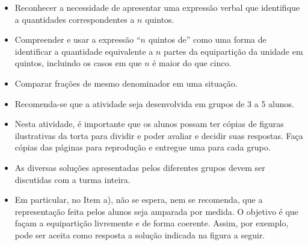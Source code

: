 \begin{multicols}{2}
\begin{objetivos}[label=chap2-ativ3]{}{}
  \begin{itemize} %
\item Reconhecer a necessidade de apresentar uma expressão verbal que identifique a quantidades correspondentes a $n$ quintos.
\item Compreender e usar a expressão ``$n$ quintos de'' como uma forma de identificar a quantidade equivalente a $n$ partes da equipartição da unidade em quintos, incluindo os casos em que $n$ é maior do que cinco.
\item Comparar frações de mesmo denominador em uma situação.
\end{itemize} %
\end{objetivos}

\begin{orientacoes}{}{}
  \begin{itemize} %
  \item Recomenda-se que a atividade seja desenvolvida em grupos de 3 a 5 alunos.
  \item Nesta atividade, é importante que os alunos possam ter cópias de figuras ilustrativas da torta para dividir e poder avaliar e decidir suas respostas. Faça cópias das páginas para reprodução e entregue uma para cada grupo.
  \item       As diversas soluções apresentadas pelos diferentes grupos devem ser discutidas com a turma inteira.
  \item       Em particular, no Item a), não se espera, nem se recomenda, que a representação feita pelos alunos seja amparada por medida. O objetivo é que façam a equipartição livremente e de forma coerente. Assim, por exemplo, pode ser aceita como resposta a solução indicada na figura a seguir.


\begin{center}



\end{center}
\end{itemize}
\end{orientacoes}
\end{multicols}
